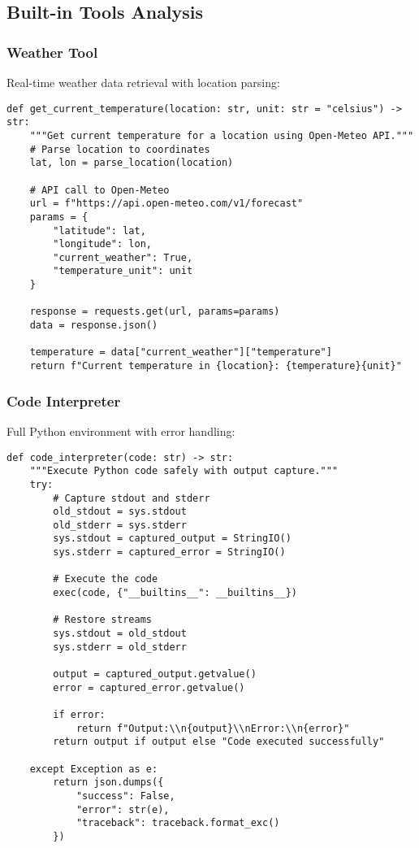 \documentclass{article}
\begin{document}
\subsection{Built-in Tools Analysis}

\subsubsection{Weather Tool}

Real-time weather data retrieval with location parsing:

\begin{lstlisting}[caption=Weather Tool Implementation]
def get_current_temperature(location: str, unit: str = "celsius") -> str:
    """Get current temperature for a location using Open-Meteo API."""
    # Parse location to coordinates
    lat, lon = parse_location(location)

    # API call to Open-Meteo
    url = f"https://api.open-meteo.com/v1/forecast"
    params = {
        "latitude": lat,
        "longitude": lon,
        "current_weather": True,
        "temperature_unit": unit
    }

    response = requests.get(url, params=params)
    data = response.json()

    temperature = data["current_weather"]["temperature"]
    return f"Current temperature in {location}: {temperature}{unit}"
\end{lstlisting}

\subsubsection{Code Interpreter}

Full Python environment with error handling:

\begin{lstlisting}[caption=Code Interpreter Tool]
def code_interpreter(code: str) -> str:
    """Execute Python code safely with output capture."""
    try:
        # Capture stdout and stderr
        old_stdout = sys.stdout
        old_stderr = sys.stderr
        sys.stdout = captured_output = StringIO()
        sys.stderr = captured_error = StringIO()

        # Execute the code
        exec(code, {"__builtins__": __builtins__})

        # Restore streams
        sys.stdout = old_stdout
        sys.stderr = old_stderr

        output = captured_output.getvalue()
        error = captured_error.getvalue()

        if error:
            return f"Output:\\n{output}\\nError:\\n{error}"
        return output if output else "Code executed successfully"

    except Exception as e:
        return json.dumps({
            "success": False,
            "error": str(e),
            "traceback": traceback.format_exc()
        })
\end{lstlisting}
\end{document}
